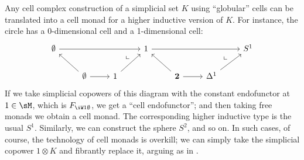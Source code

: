 \documentclass[referee]{psp}
\let\W\iW
\begin{document}
\begin{eg}\label{eg:glob-cx}
  Any cell complex construction of a simplicial set $K$ using ``globular'' cells can be translated into a cell monad for a higher inductive version of $K$.
  For instance, the circle has a 0-dimensional cell and a 1-dimensional cell:
  \[
  \begin{tikzcd}
    \emptyset \ar[rrr] &&& 1 \ar[rrr] &&& S^1 \\
    & \emptyset \ar[ul] \ar[r] \ar[urr,phantom,near end,"\llcorner"] & 1 \ar[ur] &
    & \mathbf{2} \ar[ul] \ar[r] \ar[urr,phantom,near end,"\llcorner"] & \ivl \ar[ur]
  \end{tikzcd}
  \]
  If we take simplicial copowers of this diagram with the constant endofunctor at $1\in \sM$, which is $F_{\W 1 \emptyset}$, we get a ``cell endofunctor''; and then taking free monads we obtain a cell monad.
  The corresponding higher inductive type is the usual $S^1$.
  Similarly, we can construct the sphere $S^2$, and so on.
  In such cases, of course, the technology of cell monads is overkill; we can simply take the simplicial copower $1\otimes K$ and fibrantly replace it, arguing as in .
\end{eg}
\end{document}
